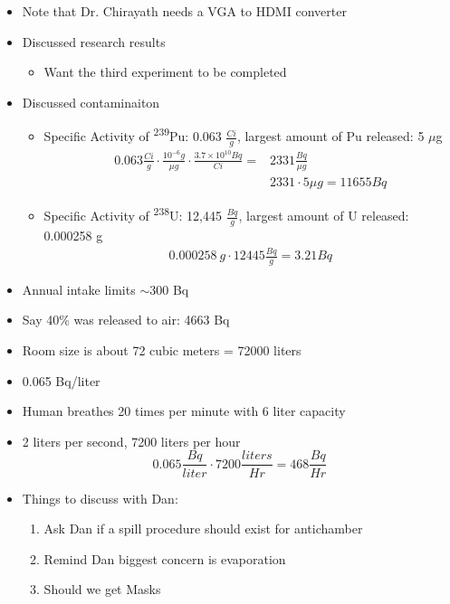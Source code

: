 \documentclass[idxtotoc,hyperref,openany,oneside]{labbook} %
\newcommand{\tss}{\textsuperscript}
\begin{document}
\begin{itemize}
\item{Note that Dr. Chirayath needs a VGA to HDMI converter}
\item{Discussed research results}
  \begin{itemize}
  \item{Want the third experiment to be completed}
  \end{itemize}
\item{Discussed contaminaiton}
  \begin{itemize}
  \item{Specific Activity of \tss{239}Pu: 0.063 $\frac{Ci}{g}$,
        largest amount of Pu released: 5 $\mu$g}
    \begin{align*}
      0.063\frac{Ci}{g}\cdot\frac{10^{-6}g}{\mu g}
      \cdot \frac{3.7\times10^{10}Bq}{Ci}=&2331
      \frac{Bq}{\mu g}\\
      &2331\cdot5\mu g=11655Bq
    \end{align*}
  \item{Specific Activity of \tss{238}U: 12,445 $\frac{Bq}{g}$,
    largest amount of U released: \\0.000258 g}
    \begin{align*}
      0.000258\ g\cdot12445\frac{Bq}{g}=3.21 Bq
    \end{align*}
  \end{itemize}
\item{Annual intake limits $\sim$300 Bq}
\item{Say 40\% was released to air: 4663 Bq}
\item{Room size is about 72 cubic meters = 72000 liters}
\item{0.065 Bq/liter}
\item{Human breathes 20 times per minute with 6 liter capacity}
\item{2 liters per second, 7200 liters per hour}
  \begin{equation*}
    0.065\frac{Bq}{liter}\cdot7200\frac{liters}{Hr}=
  468 \frac{Bq}{Hr}
  \end{equation*}
\item{Things to discuss with Dan:}
  \begin{enumerate}
  \item{Ask Dan if a spill procedure should exist for
    antichamber}
  \item{Remind Dan biggest concern is evaporation}
  \item{Should we get Masks}
  \end{enumerate}
\end{itemize}
\end{document}
